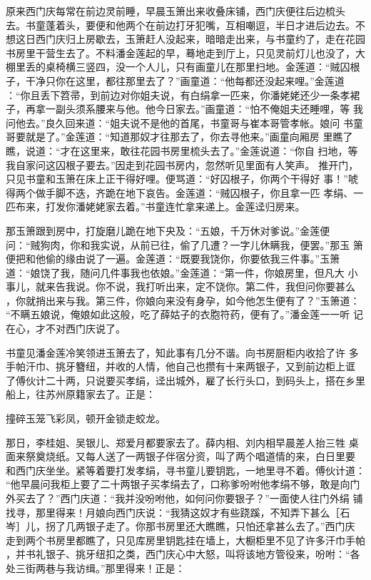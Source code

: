 原来西门庆每常在前边灵前睡，早晨玉箫出来收叠床铺，西门庆便往后边梳头
去。书童蓬着头，要便和他两个在前边打牙犯嘴，互相嘲逗，半日才进后边去。不
想这日西门庆归上房歇去，玉箫赶人没起来，暗暗走出来，与书童约了，走在花园
书房里干营生去了。不料潘金莲起的早，蓦地走到厅上，只见灵前灯儿也没了，大
棚里丢的桌椅横三竖四，没一个人儿，只有画童儿在那里扫地。金莲道：“贼囚根
子，干净只你在这里，都往那里去了？”画童道：“他每都还没起来哩。”金莲道
：“你且丢下笤帚，到前边对你姐夫说，有白绢拿一匹来，你潘姥姥还少一条孝裙
子，再拿一副头须系腰来与他。他今日家去。”画童道：“怕不俺姐夫还睡哩，等
我问他去。”良久回来道：“姐夫说不是他的首尾，书童哥与崔本哥管孝帐。娘问
书童哥要就是了。”金莲道：“知道那奴才往那去了，你去寻他来。”画童向厢房
里瞧了瞧，说道：“才在这里来，敢往花园书房里梳头去了。”金莲说道：“你自
扫地，等我自家问这囚根子要去。”因走到花园书房内，忽然听见里面有人笑声。
推开门，只见书童和玉箫在床上正干得好哩。便骂道：“好囚根子，你两个干得好
事！”唬得两个做手脚不迭，齐跪在地下哀告。金莲道：“贼囚根子，你且拿一匹
孝绢、一匹布来，打发你潘姥姥家去着。”书童连忙拿来递上。金莲迳归房来。

那玉箫跟到房中，打旋磨儿跪在地下央及：“五娘，千万休对爹说。”金莲便
问：“贼狗肉，你和我实说，从前已往，偷了几遭？一字儿休瞒我，便罢。”那玉
箫便把和他偷的缘由说了一遍。金莲道：“既要我饶你，你要依我三件事。”玉箫
道：“娘饶了我，随问几件事我也依娘。”金莲道：“第一件，你娘房里，但凡大
小事儿，就来告我说。你不说，我打听出来，定不饶你。第二件，我但问你要甚么
，你就捎出来与我。第三件，你娘向来没有身孕，如今他怎生便有了？”玉箫道：
“不瞒五娘说，俺娘如此这般，吃了薛姑子的衣胞符药，便有了。”潘金莲一一听
记在心，才不对西门庆说了。

书童见潘金莲冷笑领进玉箫去了，知此事有几分不谐。向书房厨柜内收拾了许
多手帕汗巾、挑牙簪纽，并收的人情，他自己也攒有十来两银子，又到前边柜上诓
了傅伙计二十两，只说要买孝绢，迳出城外，雇了长行头口，到码头上，搭在乡里
船上，往苏州原籍家去了。正是：

撞碎玉笼飞彩凤，顿开金锁走蛟龙。

那日，李桂姐、吴银儿、郑爱月都要家去了。薛内相、刘内相早晨差人抬三牲
桌面来祭奠烧纸。又每人送了一两银子伴宿分资，叫了两个唱道情的来，白日里要
和西门庆坐坐。紧等着要打发孝绢，寻书童儿要钥匙，一地里寻不着。傅伙计道：
“他早晨问我柜上要了二十两银子买孝绢去了，口称爹吩咐他孝绢不够，敢是向门
外买去了？”西门庆道：“我并没吩咐他，如何问你要银子？”一面使人往门外绢
铺找寻，那里得来！月娘向西门庆说：“我猜这奴才有些跷蹊，不知弄下甚么［石
岑］儿，拐了几两银子走了。你那书房里还大瞧瞧，只怕还拿甚么去了。”西门庆
走到两个书房里都瞧了，只见库房里钥匙挂在墙上，大橱柜里不见了许多汗巾手帕
，并书礼银子、挑牙纽扣之类，西门庆心中大怒，叫将该地方管役来，吩咐：“各
处三街两巷与我访缉。”那里得来！正是：


